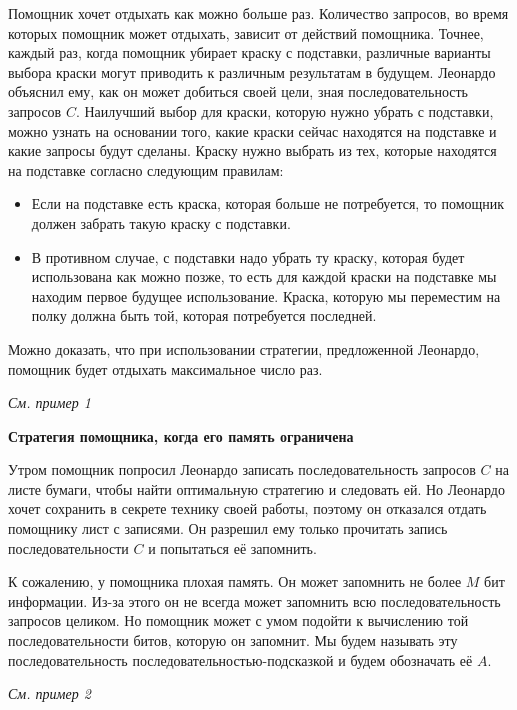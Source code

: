 Помощник хочет отдыхать как можно больше раз. Количество запросов, во время которых помощник может отдыхать, зависит от действий помощника. Точнее, каждый раз, когда помощник убирает краску с подставки, различные варианты выбора краски могут приводить к различным результатам в будущем. Леонардо объяснил ему, как он может добиться своей цели, зная последовательность запросов $C$. Наилучший выбор для краски, которую нужно убрать с подставки, можно узнать на основании того, какие краски сейчас находятся на подставке и какие запросы будут сделаны. Краску нужно выбрать из тех, которые находятся на подставке согласно следующим правилам:

\begin{itemize}

\item Если на подставке есть краска, которая больше не потребуется, то помощник должен забрать такую краску с подставки.

\item В противном случае, с подставки надо убрать ту краску, которая будет использована как можно позже, то есть для каждой краски на подставке мы находим первое будущее использование. Краска, которую мы переместим на полку должна быть той, которая потребуется последней.

\end{itemize}

Можно доказать, что при использовании стратегии, предложенной Леонардо, помощник будет отдыхать максимальное число раз.

\textit{См. пример 1}

\bf{Стратегия помощника, когда его память ограничена}

Утром помощник попросил Леонардо записать последовательность запросов $C$ на листе бумаги, чтобы найти оптимальную стратегию и следовать ей. Но Леонардо хочет сохранить в секрете технику своей работы, поэтому он отказался отдать помощнику лист с записями. Он разрешил ему только прочитать запись последовательности $C$ и попытаться её запомнить.

К сожалению, у помощника плохая память. Он может запомнить не более $M$ бит информации. Из-за этого он не всегда может запомнить всю последовательность запросов целиком. Но помощник может с умом подойти к вычислению той последовательности битов, которую он запомнит. Мы будем называть эту последовательность последовательностью-подсказкой и будем обозначать её $A$.

\textit{См. пример 2}

